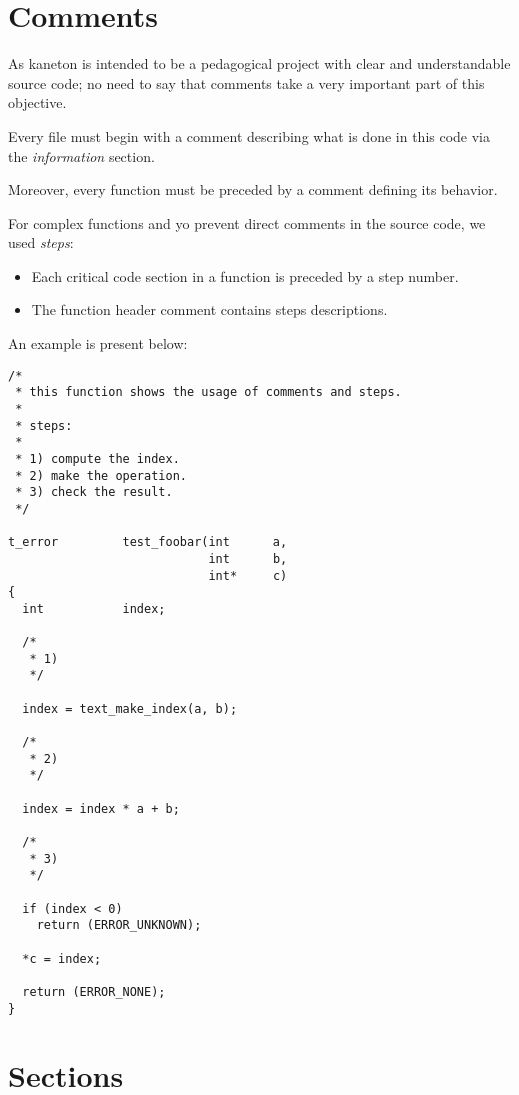 %
%

\section{Comments}

As kaneton is intended to be a pedagogical project with clear and
understandable source code; no need to say that comments take a very
important part of this objective.

Every file must begin with a comment describing what is done in this
code via the \textit{information} section.

Moreover, every function must be preceded by a comment defining its
behavior.

For complex functions and yo prevent direct comments in the source code,
we used \textit{steps}:

\begin{itemize}
  \item
    Each critical code section in a function is preceded by a step
    number.
  \item
    The function header comment contains steps descriptions.
\end{itemize}

An example is present below:

\begin{verbatim}
/*
 * this function shows the usage of comments and steps.
 *
 * steps:
 *
 * 1) compute the index.
 * 2) make the operation.
 * 3) check the result.
 */

t_error         test_foobar(int      a,
                            int      b,
                            int*     c)
{
  int           index;

  /*
   * 1)
   */

  index = text_make_index(a, b);

  /*
   * 2)
   */

  index = index * a + b;

  /*
   * 3)
   */

  if (index < 0)
    return (ERROR_UNKNOWN);

  *c = index;

  return (ERROR_NONE);
}
\end{verbatim}

%
%

\section{Sections}


